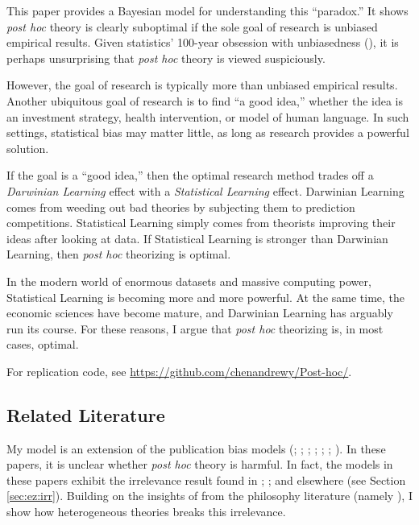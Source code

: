 \documentclass[12pt,english]{article}
\theoremstyle{plain}
\theoremstyle{plain}
\begin{document}
This paper provides a Bayesian model for understanding this ``paradox.'' It shows \emph{post hoc} theory is clearly suboptimal if the sole goal of research is unbiased empirical results. Given statistics' 100-year obsession with unbiasedness (\citet{efron2001statistical}), it is perhaps unsurprising that \emph{post hoc} theory is viewed suspiciously.

However, the goal of research is typically more than unbiased empirical results. Another ubiquitous goal of research is to find ``a good idea,'' whether the idea is an investment strategy, health intervention, or model of human language. In such settings, statistical bias may matter little, as long as research provides a powerful solution.

If the goal is a ``good idea,'' then the optimal research method trades off a \emph{Darwinian Learning} effect with a \emph{Statistical Learning} effect. Darwinian Learning comes from weeding out bad theories by subjecting them to prediction competitions. Statistical Learning simply comes from theorists improving their ideas after looking at data. If Statistical Learning is stronger than Darwinian Learning, then \emph{post hoc} theorizing is optimal.

In the modern world of enormous datasets and massive computing power, Statistical Learning is becoming more and more powerful. At the same time, the economic sciences have become mature, and Darwinian Learning has arguably run its course. For these reasons, I argue that \emph{post hoc} theorizing is, in most cases, optimal.

For replication code, see \url{https://github.com/chenandrewy/Post-hoc/}.

\subsection{Related Literature}

My model is an extension of the publication bias models (\citet{hedges1984estimation}; \citet{brodeur2016star}; \citet{andrews2019identification}; \citet{abadie2020statistical}; \citet{chen2020publication}; \citet{jensen2023there}; \citet{kasy2024optimal}). In these papers, it is unclear whether \emph{post hoc} theory is harmful. In fact, the models in these papers exhibit the irrelevance result found in \citet{hempel1966philosophy}; \citet{lakatos1970methodology}; and elsewhere (see Section \ref{sec:ez:irr}). Building on the insights of from the philosophy literature (namely \citealt{maher1988prediction}), I show how heterogeneous theories breaks this irrelevance. 
\end{document}

